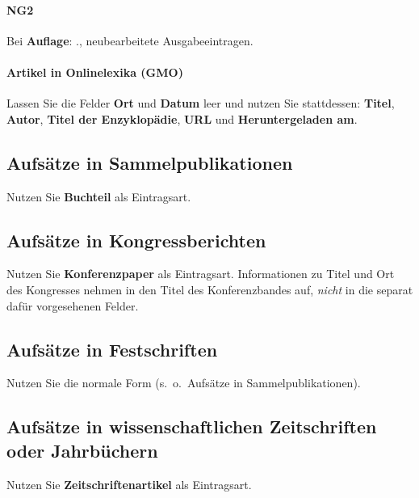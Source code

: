 \paragraph{NG2}

Bei \textbf{Auflage}: ., neubearbeitete Ausgabe\guillemotleft eintragen.

\paragraph{Artikel in Onlinelexika (GMO)}

Lassen Sie die Felder \textbf{Ort} und \textbf{Datum} leer und nutzen Sie stattdessen:  
\textbf{Titel}, \textbf{Autor}, \textbf{Titel der Enzyklop\"adie}, \textbf{URL} und \textbf{Heruntergeladen am}.

\subsection{Aufs\"atze in Sammelpublikationen}

Nutzen Sie \textbf{Buchteil} als Eintragsart.

\subsection{Aufs\"atze in Kongressberichten}

Nutzen Sie \textbf{Konferenzpaper} als Eintragsart. Informationen zu Titel und Ort des Kongresses nehmen in den Titel des Konferenzbandes auf, \emph{nicht} in die separat daf\"ur vorgesehenen Felder.

\subsection{Aufs\"atze in Festschriften}

Nutzen Sie die normale Form (s.~o.\ \guillemotright Aufs\"atze in Sammelpublikationen\guillemotleft).

\subsection{Aufs\"atze in wissenschaftlichen Zeitschriften oder Jahrb\"uchern}

Nutzen Sie \textbf{Zeitschriftenartikel} als Eintragsart.

